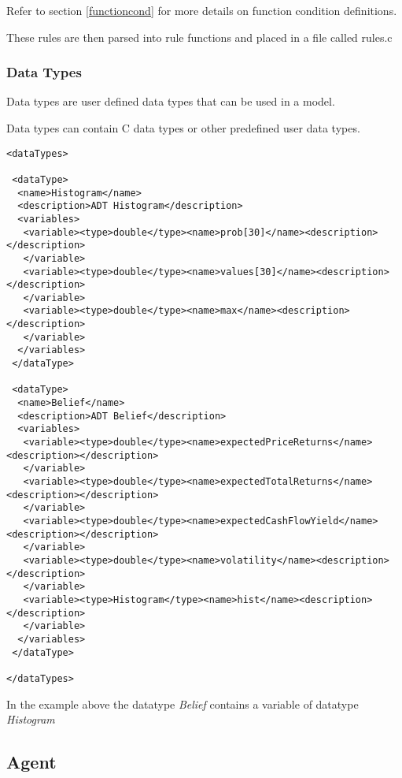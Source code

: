 Refer to section \ref{functioncond} for more details on function
condition definitions.

These rules are then parsed into rule functions and placed in a file
called rules.c

\subsubsection{Data Types}

Data types are user defined data types that can be used in a model.

Data types can contain C data types or other predefined user data types.

\begin{mylisting}
\begin{verbatim}
<dataTypes>

 <dataType>
  <name>Histogram</name>
  <description>ADT Histogram</description>
  <variables>
   <variable><type>double</type><name>prob[30]</name><description></description>
   </variable>
   <variable><type>double</type><name>values[30]</name><description></description>
   </variable>
   <variable><type>double</type><name>max</name><description></description>
   </variable>
  </variables>
 </dataType>

 <dataType>
  <name>Belief</name>
  <description>ADT Belief</description>
  <variables>
   <variable><type>double</type><name>expectedPriceReturns</name><description></description>
   </variable>
   <variable><type>double</type><name>expectedTotalReturns</name><description></description>
   </variable>
   <variable><type>double</type><name>expectedCashFlowYield</name><description></description>
   </variable>
   <variable><type>double</type><name>volatility</name><description></description>
   </variable>
   <variable><type>Histogram</type><name>hist</name><description></description>
   </variable>
  </variables>
 </dataType>

</dataTypes>
\end{verbatim}
\end{mylisting}

In the example above the datatype \emph{Belief} contains a variable
of datatype \emph{Histogram}

\subsection{Agent}

